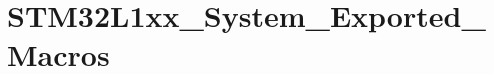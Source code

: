 \hypertarget{group___s_t_m32_l1xx___system___exported___macros}{\section{S\-T\-M32\-L1xx\-\_\-\-System\-\_\-\-Exported\-\_\-\-Macros}
\label{group___s_t_m32_l1xx___system___exported___macros}
}
